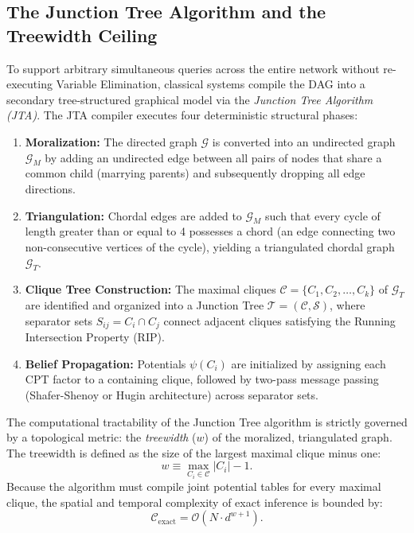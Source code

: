\subsection{The Junction Tree Algorithm and the Treewidth Ceiling}
To support arbitrary simultaneous queries across the entire network without re-executing Variable Elimination, classical systems compile the DAG into a secondary tree-structured graphical model via the \emph{Junction Tree Algorithm (JTA)}. The JTA compiler executes four deterministic structural phases:
\begin{enumerate}
    \item \textbf{Moralization:} The directed graph $\mathcal{G}$ is converted into an undirected graph $\mathcal{G}_M$ by adding an undirected edge between all pairs of nodes that share a common child (marrying parents) and subsequently dropping all edge directions.
    \item \textbf{Triangulation:} Chordal edges are added to $\mathcal{G}_M$ such that every cycle of length greater than or equal to 4 possesses a chord (an edge connecting two non-consecutive vertices of the cycle), yielding a triangulated chordal graph $\mathcal{G}_T$.
    \item \textbf{Clique Tree Construction:} The maximal cliques $\mathcal{C} = \{C_1, C_2, \dots, C_k\}$ of $\mathcal{G}_T$ are identified and organized into a Junction Tree $\mathcal{T} = (\mathcal{C}, \mathcal{S})$, where separator sets $S_{ij} = C_i \cap C_j$ connect adjacent cliques satisfying the Running Intersection Property (RIP).
    \item \textbf{Belief Propagation:} Potentials $\psi(C_i)$ are initialized by assigning each CPT factor to a containing clique, followed by two-pass message passing (Shafer-Shenoy or Hugin architecture) across separator sets.
\end{enumerate}

The computational tractability of the Junction Tree algorithm is strictly governed by a topological metric: the \emph{treewidth} ($w$) of the moralized, triangulated graph. The treewidth is defined as the size of the largest maximal clique minus one:
\begin{equation}
w \equiv \max_{C_i \in \mathcal{C}} |C_i| - 1.
\label{eq:treewidth_definition}
\end{equation}
Because the algorithm must compile joint potential tables for every maximal clique, the spatial and temporal complexity of exact inference is bounded by:
\begin{equation}
\mathcal{C}_{\mathrm{exact}} = \mathcal{O}\left(N \cdot d^{w+1}\right).
\label{eq:jta_treewidth_bound_ch2}
\end{equation}

